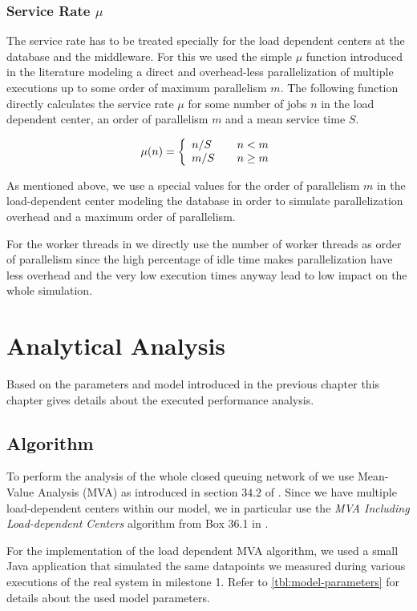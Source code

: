 \documentclass[a4paper, oneside]{csthesis}
\begin{document}
\subsection{Service Rate $\mu$}
\label{sec:service-rate}
The service rate has to be treated specially for the load dependent centers
at the database and the middleware. For this we used the simple $\mu$ function
introduced in the literature \cite{jain2008art} modeling a direct and
overhead-less parallelization of multiple executions up to some order of maximum
parallelism $m$. The following function directly calculates the service rate
$\mu$ for some number of jobs $n$ in the load dependent center, an order of
parallelism $m$ and a mean service time $S$.

\[ 
\mu(n) = \left\{ 
  \begin{array}{l l}
    n/S         & \quad n < m       \\
    m/S         & \quad n \geq m
  \end{array} \right.
\]

As mentioned above, we use a special values for the order of parallelism $m$ in
the load-dependent center modeling the database in order to simulate
parallelization overhead and a maximum order of parallelism.

For the worker threads in \telesto{} we directly use the number of worker
threads as order of parallelism since the high percentage of idle time makes
parallelization have less overhead and the very low execution times anyway lead
to low impact on the whole simulation.

\chapter{Analytical Analysis}
Based on the parameters and model introduced in the previous chapter this
chapter gives details about the executed performance analysis.

\section{Algorithm}
To perform the analysis of the whole closed queuing network of \telesto{} we use
Mean-Value Analysis (MVA) as introduced in section $34.2$ of \cite{jain2008art}.
Since we have multiple load-dependent centers within our model, we in particular
use the {\it MVA Including Load-dependent Centers} algorithm from Box 36.1 in
\cite{jain2008art}.

For the implementation of the load dependent MVA algorithm, we used a small Java
application that simulated the same datapoints we measured during various
executions of the real \telesto{} system in milestone 1. Refer to
\cref{tbl:model-parameters} for details about the used model parameters.
\end{document}
